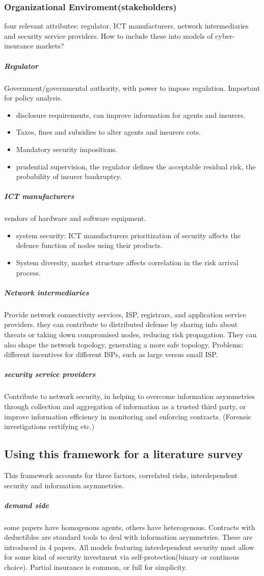 \subsubsection{Organizational Enviroment(stakeholders)}
four relevant attributes: regulator, ICT manufacturers, network intermediaries and security service providers. How to include these into models of cyber-insurance markets?
\subparagraph{Regulator}
Government/governmental authority, with power to impose regulation. Important for policy analysis.
\begin{itemize}
\item disclosure requirements, can improve information for agents and insurers.
\item Taxes, fines and subsidies to alter agents and insurers cots.
\item Mandatory security impositions.
\item prudential supervision, the regulator defines the acceptable residual risk, the probability of insurer bankruptcy.
\end{itemize}
\subparagraph{ICT manufacturers}
vendors of hardware and software equipment. 
\begin{itemize}
\item system security: ICT manufacturers prioritization of security affects the defence function of nodes using their products.
\item System diversity, market structure affects correlation in the risk arrival process.

\end{itemize} 
\subparagraph{Network intermediaries}
Provide network connectivity services, ISP, registrars, and application service providers.
  they can contribute to distributed defense by sharing info about threats
   or taking down compromised nodes, reducing risk propagation. They can also shape the network topology, generating a more safe topology. 
   Problems: different incentives for different ISPs, such as large versus small ISP. 
\subparagraph{security service providers}
Contribute to network security, in helping to overcome information asymmetries through collection and aggregation of information as a trusted third party, or improve information efficiency in monitoring and enforcing contracts. (Forensic investigations certifying etc.)
\subsection{Using this framework for a literature survey}
This framework accounts for three factors, correlated risks, interdependent security and information asymmetries. 
\subparagraph{demand side}
some papers have homogenous agents, others have heterogenous. Contracts with deductibles are standard tools to deal with information asymmetries. These are introduced in 4 papers.
All models featuring interdependent security must allow for some kind of security investment via self-protection(binary or continous choice). Partial insurance is common, or full for simplicity.

